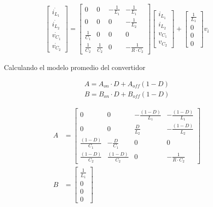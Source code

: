 \begin{align*}
    \begin{bmatrix}
        \dot{i_{L_1}} \\ 
        \dot{i_{L_2}} \\ 
        \dot{v_{C_1}} \\ 
        \dot{v_{C_2}}
    \end{bmatrix}
    =
    \begin{bmatrix}
        0 & 0 & -\frac{1}{L_1} & -\frac{1}{L_1} \\ 
        0 & 0 & 0 & -\frac{1}{L_2} \\ 
        \frac{1}{C_1} & 0 & 0 & 0 \\ 
        \frac{1}{C_2} & \frac{1}{C_2} & 0 & -\frac{1}{R\cdot C_2}
    \end{bmatrix}
    \begin{bmatrix}
        i_{L_1} \\ 
        i_{L_2} \\ 
        v_{C_1} \\ 
        v_{C_2}
    \end{bmatrix}
    +
    \begin{bmatrix}
        \frac{1}{L_1} \\ 
        0 \\ 
        0 \\ 
        0 
    \end{bmatrix}
    v_i
\end{align*}

Calculando el modelo promedio del convertidor

\begin{align*}
    A=A_{on}\cdot D + A_{off} (1-D) \\
    B=B_{on}\cdot D + B_{off} (1-D) 
\end{align*}

\begin{align*}
    A
    &=
    \begin{bmatrix}
        0 & 0 & -\frac{(1-D)}{L_1} & -\frac{(1-D)}{L_1} \\ 
        0 & 0 & \frac{D}{L_2} & -\frac{(1-D)}{L_2} \\ 
        \frac{(1-D)}{C_1} & -\frac{D}{C_1} & 0 & 0 \\ 
        \frac{(1-D)}{C_2} & \frac{(1-D)}{C_2} & 0 & -\frac{1}{R\cdot C_2}
    \end{bmatrix} \\ 
    B 
    &=
    \begin{bmatrix}
        \frac{1}{L_1} \\ 
        0 \\ 
        0 \\ 
        0 
    \end{bmatrix}
\end{align*}


